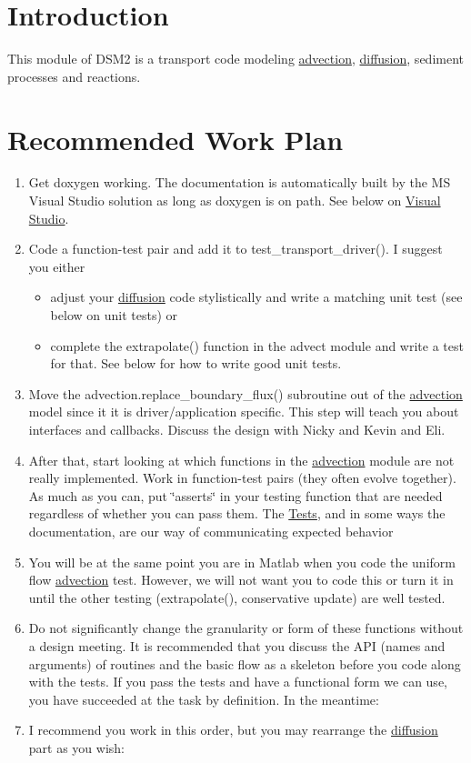 \hypertarget{index_intro_sec}{}\section{Introduction}\label{index_intro_sec}
This module of DSM2 is a transport code modeling \hyperlink{a00052}{advection}, \hyperlink{a00056}{diffusion}, sediment processes and reactions.\hypertarget{index_order}{}\section{Recommended Work Plan}\label{index_order}
\begin{enumerate}
\item Get doxygen working. The documentation is automatically built by the MS Visual Studio solution as long as doxygen is on path. See below on \hyperlink{index_viz}{Visual Studio}.\item Code a function-test pair and add it to test\_\-transport\_\-driver(). I suggest you either\begin{itemize}
\item adjust your \hyperlink{a00056}{diffusion} code stylistically and write a matching unit test (see below on unit tests) or\item complete the extrapolate() function in the advect module and write a test for that. See below for how to write good unit tests.\end{itemize}
\item Move the advection.replace\_\-boundary\_\-flux() subroutine out of the \hyperlink{a00052}{advection} model since it it is driver/application specific. This step will teach you about interfaces and callbacks. Discuss the design with Nicky and Kevin and Eli.\item After that, start looking at which functions in the \hyperlink{a00052}{advection} module are not really implemented. Work in function-test pairs (they often evolve together). As much as you can, put \char`\"{}asserts\char`\"{} in your testing function that are needed regardless of whether you can pass them. The \hyperlink{index_tests}{Tests}, and in some ways the documentation, are our way of communicating expected behavior\item You will be at the same point you are in Matlab when you code the uniform flow \hyperlink{a00052}{advection} test. However, we will not want you to code this or turn it in until the other testing (extrapolate(), conservative update) are well tested.\item Do not significantly change the granularity or form of these functions without a design meeting. It is recommended that you discuss the API (names and arguments) of routines and the basic flow as a skeleton before you code along with the tests. If you pass the tests and have a functional form we can use, you have succeeded at the task by definition. In the meantime:\item I recommend you work in this order, but you may rearrange the \hyperlink{a00056}{diffusion} part as you wish:\begin{itemize}

\end{itemize}
\end{enumerate}
